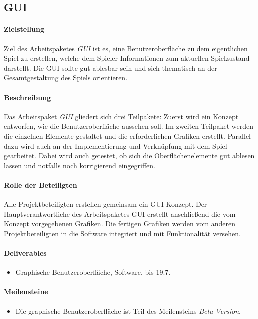 \subsection{GUI}

\paragraph{Zielstellung}\noindent
Ziel des Arbeitspaketes \textit{GUI} ist es, eine Benutzeroberfläche zu dem eigentlichen Spiel zu erstellen, welche dem Spieler Informationen zum aktuellen Spielzustand darstellt. Die GUI sollte gut ablesbar sein und sich thematisch an der Gesamtgestaltung des Spiels orientieren.

\paragraph{Beschreibung}\noindent
Das Arbeitspaket \textit{GUI} gliedert sich drei Teilpakete: Zuerst wird ein Konzept entworfen, wie die Benutzeroberfläche aussehen soll. Im zweiten Teilpaket werden die einzelnen Elemente gestaltet und die erforderlichen Grafiken erstellt. Parallel dazu wird auch an der Implementierung und Verknüpfung mit dem Spiel gearbeitet. Dabei wird auch getestet, ob sich die Oberflächenelemente gut ablesen lassen und notfalls noch korrigierend eingegriffen.

\paragraph{Rolle der Beteiligten}\noindent
Alle Projektbeteiligten erstellen gemeinsam ein GUI-Konzept. Der Hauptverantwortliche des Arbeitspaketes GUI erstellt anschließend die vom Konzept vorgegebenen Grafiken. Die fertigen Grafiken werden vom anderen Projektbeteiligten in die Software integriert und mit Funktionalität versehen.

\paragraph{Deliverables}\noindent
\begin{itemize}
\item Graphische Benutzeroberfläche, Software, bis 19.7.
\end{itemize}

\paragraph{Meilensteine}\noindent
\begin{itemize}
\item Die graphische Benutzeroberfläche ist Teil des Meilensteins \textit{Beta-Version}.
\end{itemize}